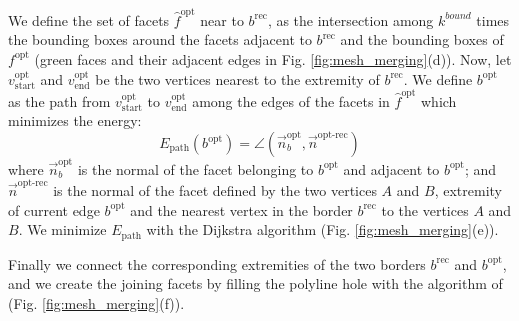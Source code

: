 We define the set of facets $\hat{f}^{\text{opt}}$ near to $\mathit{b}^{\text{rec}}$, as the intersection among  $k^{bound}$ times the bounding boxes around the facets adjacent to  $\mathit{b}^{\text{rec}}$ and the bounding boxes of $f^{\text{opt}}$  (green faces and their adjacent edges in Fig. \ref{fig:mesh_merging}(d)).
Now, let  $v_{\text{start}}^{\text{opt}}$ and $v_{\text{end}}^{\text{opt}}$ be the two vertices nearest to the extremity of  $\mathit{b}^{\text{rec}}$. 
We define $\mathit{b}^{\text{opt}}$ as the path from $v_{\text{start}}^{\text{opt}}$ to $v_{\text{end}}^{\text{opt}}$ among the edges of the facets in $\hat{f}^{\text{opt}}$ which minimizes the energy:
\begin{equation}
  E_{\text{path}}(b^{\text{opt}}) = \angle (\overrightarrow{n}_b^{\text{opt}},\overrightarrow{n}^{\text{opt-rec}})
\end{equation}
where $\overrightarrow{n}_b^{\text{opt}}$ is the normal of the facet belonging to $\mathit{b}^{\text{opt}}$ and adjacent to  $b^{\text{opt}}$; and
$\overrightarrow{n}^{\text{opt-rec}}$ is the normal of the facet defined by the two vertices $A$ and $B$, extremity of current edge ${b}^{\text{opt}}$ and the nearest vertex in the border $\mathit{b}^{\text{rec}}$ to the vertices $A$ and $B$.
We minimize $E_{\text{path}}$ with the Dijkstra algorithm  (Fig. \ref{fig:mesh_merging}(e)).

Finally we connect the corresponding extremities of the two borders $\mathit{b}^{\text{rec}}$ and $\mathit{b}^{\text{opt}}$, and we create the joining facets by filling the polyline hole with the algorithm of \cite{liepa2003filling}  (Fig. \ref{fig:mesh_merging}(f)).


